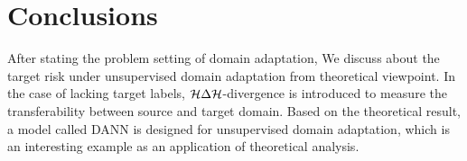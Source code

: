 \section{Conclusions}\label{sect:conclusion}
After stating the problem setting of domain adaptation, We discuss about the target risk under unsupervised domain adaptation from theoretical viewpoint.
In the case of lacking target labels, $\mathcal{H} \Delta \mathcal{H}$-divergence is introduced to  measure the transferability between source and target domain.
Based on the theoretical result, a model called DANN is designed for unsupervised domain adaptation, which is an interesting example as an application of theoretical analysis.
